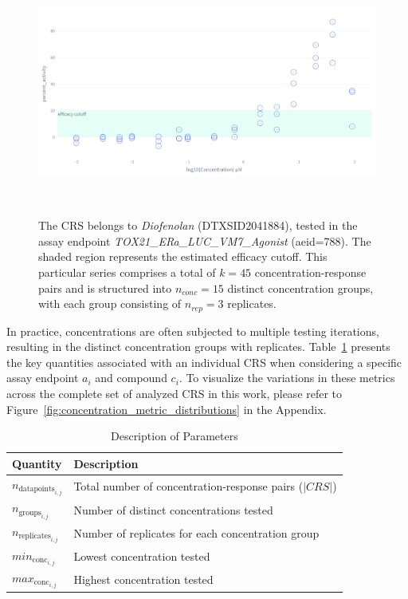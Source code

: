\begin{figure}
    \centering
    \includegraphics[width=1.0\textwidth]{figures/CRS.png}  
    \caption{The CRS belongs to \emph{Diofenolan} (DTXSID2041884), tested in the assay endpoint \emph{TOX21\_ERa\_LUC\_VM7\_Agonist} (aeid=788). The shaded region represents the estimated efficacy cutoff. This particular series comprises a total of $k = 45$ concentration-response pairs and is structured into $n_{conc} = 15$ distinct concentration groups, with each group consisting of $n_{rep} = 3$ replicates. }
~\label{fig:concentration_response_series} 
\end{figure}

In practice, concentrations are often subjected to multiple testing iterations, resulting in the distinct concentration groups with replicates. Table~\ref{tab:concentrations_quantities} presents the key quantities associated with an individual CRS when considering a specific assay endpoint $a_i$ and compound $c_i$. To visualize the variations in these metrics across the complete set of analyzed CRS in this work, please refer to Figure~\ref{fig:concentration_metric_distributions} in the Appendix. 

\begin{table}
    \centering
    \caption{Description of Parameters}
    \label{tab:concentrations_quantities}
    \begin{tabular}{ll}
        \toprule
        \textbf{Quantity} & \textbf{Description} \\
        \midrule
        $n_{\text{datapoints}_{i,j}}$ & Total number of concentration-response pairs ($|CRS|$) \\
        $n_{\text{groups}_{i,j}}$ & Number of distinct concentrations tested \\
        $n_{\text{replicates}_{i,j}}$ & Number of replicates for each concentration group \\
        $min_{\text{conc}_{i,j}}$ & Lowest concentration tested \\
        $max_{\text{conc}_{i,j}}$ & Highest concentration tested \\
        \bottomrule
    \end{tabular}
\end{table}

